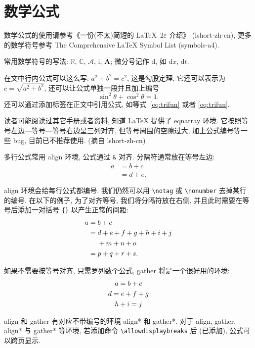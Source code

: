 \section{数学公式}\label{sec:mathEqEnv}

数学公式的使用请参考《一份(不太)简短的 \LaTeX~2$\varepsilon$ 介绍》 (lshort-zh-cn), 更多的数学符号参考 The Comprehensive LaTeX Symbol List (symbols-a4).

常用数学符号的写法: $\mathbb{R}$, $\mathbb{C}$, $\mathcal{A}$, $\mathrm{i}$, $\boldsymbol{A}$; 微分号记作 $\mathrm{d}$, 如 $\mathrm{d}x$, $\mathrm{d}t$.

在文中行内公式可以这么写: $a^2+b^2=c^2$, 这是勾股定理, 它还可以表示为 $c=\sqrt{a^2+b^2}$, 还可以让公式单独一段并且加上编号
\begin{equation}\label{eq:trifun}
\sin^2{\theta}+\cos^2{\theta}=1.
\end{equation}
还可以通过添加标签在正文中引用公式, 如等式~\eqref{eq:trifun} 或者 \ref{eq:trifun}.

读者可能阅读过其它手册或者资料, 知道 LaTeX 提供了 eqnarray 环境. 它按照等号左边—等号—等号右边呈三列对齐, 但等号周围的空隙过大, 加上公式编号等一些 bug, 目前已不推荐使用. (摘自 lshort-zh-cn)

多行公式常用 align 环境, 公式通过 \verb|&| 对齐. 分隔符通常放在等号左边:
\begin{align}
a & = b + c \\
& = d + e.
\end{align}

align 环境会给每行公式都编号. 我们仍然可以用 \verb|\notag| 或 \verb|\nonumber| 去掉某行的编号. 在以下的例子,
为了对齐等号, 我们将分隔符放在右侧, 并且此时需要在等号后添加一对括号 \verb|{}| 以产生正常的间距:
\begin{align}
a ={} & b + c \\
={} & d + e + f + g + h + i + j \notag \\
& + m + n + o \\
={} & p + q + r + s.
\end{align}

如果不需要按等号对齐, 只需罗列数个公式, gather 将是一个很好用的环境:
\begin{gather}
a = b + c \\
d = e + f + g \notag \\
h + i = j
\end{gather}

align 和 gather 有对应不带编号的环境 align* 和 gather*.
对于 align, gather, align* 与 gather* 等环境, 若添加命令 \verb|\allowdisplaybreaks| 后 (已添加), 公式可以跨页显示.


